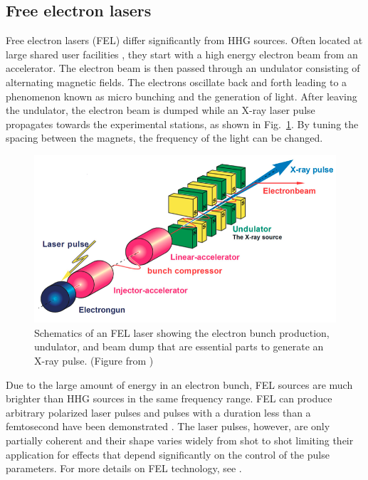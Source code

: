 \subsection{Free electron lasers} %
\label{sub:free_electron_lasers}
Free electron lasers (FEL) differ significantly from HHG sources. Often located at large shared user facilities \cite{seddon2017}, they start with a high energy electron beam from an accelerator. The electron beam is then passed through an undulator consisting of alternating magnetic fields. The electrons oscillate back and forth leading to a phenomenon known as micro bunching and the generation of light. After leaving the undulator, the electron beam is dumped while an X-ray laser pulse propagates towards the experimental stations, as shown in Fig.~\ref{fig:FEL_diagram}. By tuning the spacing between the magnets, the frequency of the light can be changed. 

\begin{figure}[!ht]
\centering
\includegraphics[width=0.8\columnwidth]{figs/Intro/FEL.png}
\caption{\label{fig:FEL_diagram} Schematics of an FEL laser showing the electron bunch production, undulator, and beam dump that are essential parts to generate an X-ray pulse. (Figure from \cite{rauschenbergerFEL})
}
\end{figure}

Due to the large amount of energy in an electron bunch, FEL sources are much brighter than HHG sources in the same frequency range. FEL can produce arbitrary polarized laser pulses \cite{ilchen2017} and pulses with a duration less than a femtosecond have been demonstrated \cite{marinelli2017}. The laser pulses, however, are only partially coherent and their shape varies widely from shot to shot limiting their application for effects that depend significantly on the control of the pulse parameters. For more details on FEL technology, see  \cite{seddon2017}.

